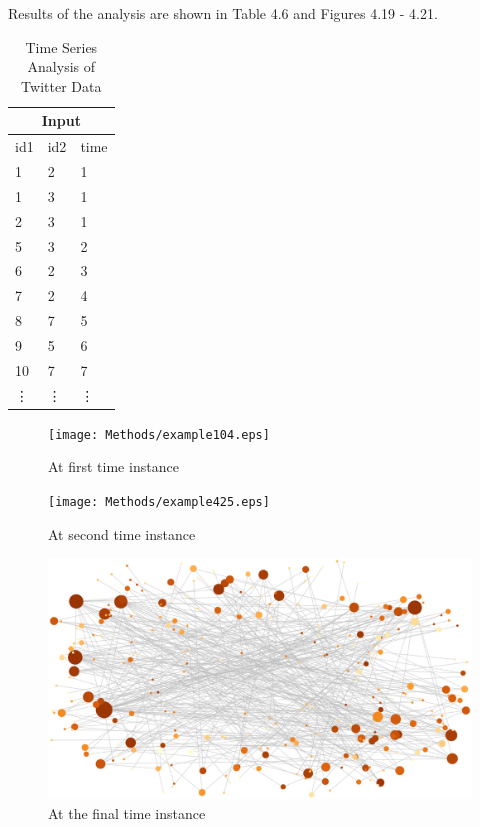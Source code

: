 
Results of the analysis are shown in Table 4.6 and Figures 4.19 - 4.21.

\begin{table}
\centering
\begin{tabular}{lll}\\ \hline
\multicolumn{3}{c}{Input}\\ \hline
id1 & id2 & time \\ \hline
1 & 2 & 1 \\
1 & 3 & 1 \\
2 & 3 & 1 \\
5 & 3 & 2 \\
6 & 2 & 3 \\
7 & 2 & 4 \\
8 & 7 & 5 \\
9 & 5 & 6 \\
10 & 7 & 7 \\
\vdots & \vdots &\vdots\\ \hline
\end{tabular}
\caption{Time Series Analysis of Twitter Data}
\end{table}

\begin{figure}[hb]
\centering
\begin{minipage}{0.45\linewidth}
\texttt{[image: Methods/example104.eps]}
\caption{At first time instance}
\end{minipage}
\quad
\begin{minipage}{0.45\linewidth}
\texttt{[image: Methods/example425.eps]}
\caption{At second time instance}
\end{minipage}
\end{figure}
\begin{figure}
\includegraphics[scale=0.3]{Methods/example2971.eps}
\caption{At the final time instance}
\end{figure}




